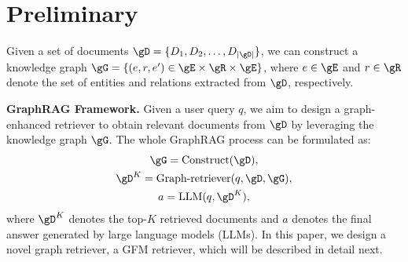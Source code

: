 \section{Preliminary}\label{sec:preliminary}
Given a set of documents $\gD=\{D_1,D_2,\ldots,D_{|\gD|}\}$, we can construct a knowledge graph $\gG=\{(e,r,e')\in \gE\times\gR\times\gE\}$, where $e\in\gE$ and $r\in\gR$ denote the set of entities and relations extracted from $\gD$, respectively. 

\noindent\textbf{GraphRAG Framework.} 
Given a user query $q$, we aim to design a graph-enhanced retriever to obtain relevant documents from $\gD$ by leveraging the knowledge graph $\gG$. The whole GraphRAG process  can be formulated as:
\begin{gather}
    \gG = \text{Construct}(\gD), \\ \gD^K = \text{Graph-retriever}(q,\gD,\gG),\\
    a = \text{LLM}(q,\gD^K),
\end{gather}
where $\gD^K$ denotes the top-$K$ retrieved documents and $a$ denotes the final answer generated by large language models (LLMs). In this paper, we design a novel graph retriever, a GFM retriever, which will be described in detail next.